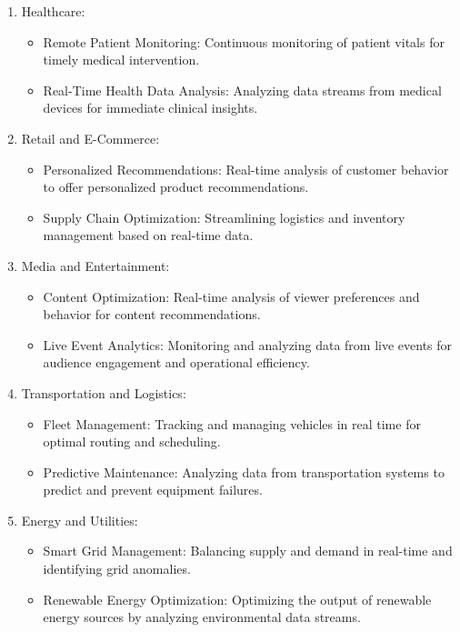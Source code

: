 \documentclass[11pt, reqno]{amsart}
\theoremstyle{definition}
\theoremstyle{remark}
\begin{document}
\begin{enumerate}
  \item Healthcare:
        \begin{itemize}
          \item Remote Patient Monitoring: Continuous monitoring of patient vitals for
                timely medical intervention.
          \item Real-Time Health Data Analysis: Analyzing data streams from medical
                devices for immediate clinical insights.
        \end{itemize}

  \item Retail and E-Commerce:
        \begin{itemize}
          \item Personalized Recommendations: Real-time analysis of customer behavior
                to offer personalized product recommendations.
          \item Supply Chain Optimization: Streamlining logistics and inventory
                management based on real-time data.
        \end{itemize}

  \item Media and Entertainment:
        \begin{itemize}
          \item Content Optimization: Real-time analysis of viewer preferences and
                behavior for content recommendations.
          \item Live Event Analytics: Monitoring and analyzing data from live events
                for audience engagement and operational efficiency.
        \end{itemize}

  \item Transportation and Logistics:
        \begin{itemize}
          \item Fleet Management: Tracking and managing vehicles in real time for
                optimal routing and scheduling.
          \item Predictive Maintenance: Analyzing data from transportation systems to
                predict and prevent equipment failures.
        \end{itemize}

  \item Energy and Utilities:
        \begin{itemize}
          \item Smart Grid Management: Balancing supply and demand in real-time and
                identifying grid anomalies.
          \item Renewable Energy Optimization: Optimizing the output of renewable
                energy sources by analyzing environmental data streams.
        \end{itemize}


\end{enumerate}
\end{document}
